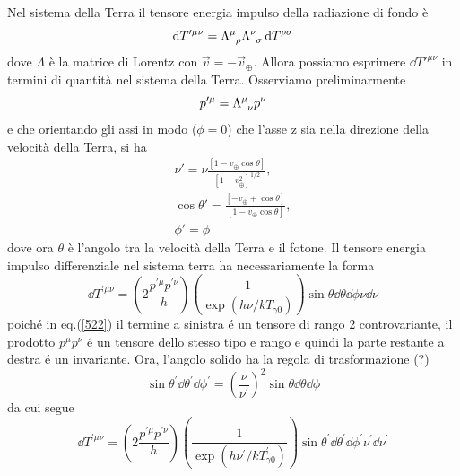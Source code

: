 Nel sistema della Terra il tensore energia impulso della radiazione di fondo è
\begin{equation}
  \dd T'^{\mu \nu} = \tensor{\Lambda}{^{\mu}_{\rho}} \tensor{\Lambda}{^{\nu}_{\sigma}}
  \dd T^{\rho\sigma}
\end{equation}
dove $\Lambda$ è la matrice di Lorentz con $\vec{v} = - \vec{v}_{\oplus}$.
Allora possiamo esprimere $\dd T'^{\mu \nu}$ in termini di quantità nel sistema
della Terra.  Osserviamo preliminarmente
\begin{equation}
  p'^{\mu } = \tensor{\Lambda}{^{\mu}_{\nu}} p^{\nu}
\end{equation}
e che orientando gli assi in modo ($\phi=0$) che l'asse z sia nella direzione della
velocità della Terra,  si ha
\begin{subequations}
  \begin{gather}
    \nu' = \nu \frac{[1-v_{\oplus}\cos\theta]}{[ 1 - v_{\oplus}^2]^{1/2}}, \\
    \cos\theta' = \frac{[- v_{\oplus} + \cos\theta]}{[1 - v_{\oplus}
      \cos\theta]}, \\
    \phi' = \phi
  \end{gather}
\end{subequations}
dove ora $\theta$ è l'angolo tra la velocità della Terra e il fotone.
Il tensore energia impulso differenziale nel sistema terra ha necessariamente la forma
\begin{equation}
  \dd T^{\prime \mu \nu}= \left( 2 \frac{ p^{\prime \mu} p^{\prime \nu} }{h} \right)
                   \left( \frac{1} { \exp (h \nu/ kT_{\gamma 0 }) } \right)
  \sin \theta \dd\theta \dd\phi \nu \dd\nu
\end{equation}
poich\'e in eq.(\ref{522}) il termine a sinistra \'e un tensore di rango 2 controvariante,
il prodotto $p^{\mu} p^{\nu}$ \'e un tensore dello stesso tipo e rango e quindi la parte
restante a destra \'e un invariante.
Ora, l'angolo solido ha la regola di trasformazione (?)
\begin{equation}
 \sin \theta^{\prime} \dd\theta^{\prime} \dd\phi^{\prime}
= \left( \frac {\nu}{\nu^{\prime}} \right)^2 \sin \theta \dd\theta \dd\phi
\end{equation}
da cui segue
\begin{equation}
  \dd T^{\prime \mu \nu}= \left( 2 \frac{ p^{\prime \mu} p^{\prime \nu} }{h} \right)
                   \left( \frac{1} { \exp (h \nu^{\prime}/ kT^{\prime}_{\gamma 0 }) } \right)
  \sin \theta^{\prime} \dd\theta^{\prime} \dd\phi^{\prime} \nu^{\prime} \dd\nu^{\prime}
\end{equation}
